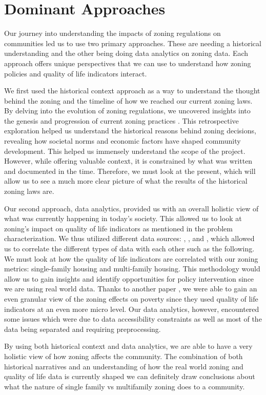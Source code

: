 \documentclass[titlepage]{article}
\begin{document}
\section{Dominant Approaches}
Our journey into understanding the impacts of zoning regulations on communities led us to use two primary approaches. These are needing a historical understanding and the other being doing data analytics on zoning data. Each approach offers unique perspectives that we can use to understand how zoning policies and quality of life indicators interact.

We first used the historical context approach as a way to understand the thought behind the zoning and the timeline of how we reached our current zoning laws. By delving into the evolution of zoning regulations, we uncovered insights into the genesis and progression of current zoning practices \cite{freemark}. This retrospective exploration helped us understand the historical reasons behind zoning decisions, revealing how societal norms and economic factors have shaped community development. This helped us immensely understand the scope of the project. However, while offering valuable context, it is constrained by what was written and documented in the time. Therefore, we must look at the present, which will allow us to see a much more clear picture of what the results of the historical zoning laws are. 

Our second approach, data analytics, provided us with an overall holistic view of what was currently happening in today's society. This allowed us to look at zoning's impact on quality of life indicators as mentioned in the problem characterization. We thus utilized different data sources: \cite{kaggle}, \cite{isqols}, \cite{koordinates} and \cite{uscensus}, which allowed us to correlate the different types of data with each other such as the following. We must look at how the quality of life indicators are correlated with our zoning metrics: single-family housing and multi-family housing. This methodology would allow us to gain insights and identify opportunities for policy intervention since we are using real world data. Thanks to another paper \cite{zoning}, we were able to gain an even granular view of the zoning effects on poverty since they used quality of life indicators at an even more micro level. Our data analytics, however, encountered some issues which were due to data accessibility constraints as well as most of the data being separated and requiring preprocessing.

By using both historical context and data analytics, we are able to have a very holistic view of how  zoning affects the community. The combination of both historical narratives and an understanding of how the real world zoning and quality of life data is currently shaped we can definitely draw conclusions about what the nature of single family vs multifamily zoning does to a community.
\end{document}
